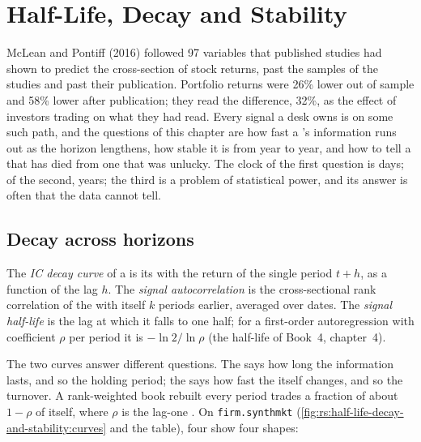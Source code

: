 \chapter{Half-Life, Decay and Stability}\label{ch:rs:half-life-decay-and-stability}

McLean and Pontiff (2016) followed 97 variables that published studies had shown to predict the cross-section of stock returns,
past the samples of the studies and past their publication. Portfolio returns were 26\% lower out of sample and 58\% lower after
publication; they read the difference, 32\%, as the effect of investors trading on what they had read. Every signal a desk owns is
on some such path, and the questions of this chapter are how fast a 's information runs out as the horizon lengthens, how
stable it is from year to year, and how to tell a  that has died from one that was unlucky. The clock of the first question is
days; of the second, years; the third is a problem of statistical power, and its answer is often that the data cannot tell.

\section{Decay across horizons}

\begin{definition}\label{def:rs:half-life-decay-and-stability:decay}
The \emph{IC decay curve} of a  is its  with the return of the single period
$t + h$, as a function of the lag $h$. The \emph{signal autocorrelation} is the cross-sectional rank
correlation of the  with itself $k$ periods earlier, averaged over dates. The \emph{signal half-life} is
the lag at which it falls to one half; for a first-order autoregression with coefficient $\rho$ per period it is $-\ln 2/\ln\rho$ (the
half-life of Book~4, chapter~4).
\end{definition}

The two curves answer different questions. The  says how long the information lasts, and so the holding period; the  says how fast the  itself changes, and so the turnover. A rank-weighted book rebuilt every period trades a fraction
of about $1 - \rho$ of itself, where $\rho$ is the lag-one . On \texttt{firm.synthmkt}
(\cref{fig:rs:half-life-decay-and-stability:curves} and the table), four  show four shapes:

